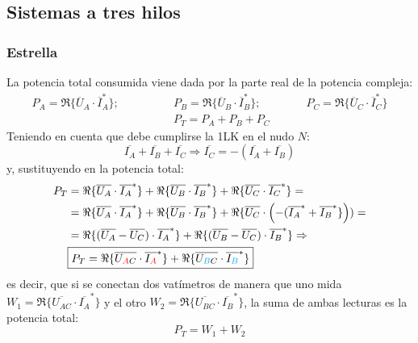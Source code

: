 	\subsection{Sistemas a tres hilos}\label{sec:potencia_3H}
	
	\subsubsection{Estrella}
	
	La potencia total consumida viene dada por la parte real de la potencia compleja: 
	\begin{align*}
	    P_A=\Re\{\overline{U}_A \cdot \overline{I}_A^*\};\qquad \qquad
	    &P_B=\Re\{\overline{U}_B \cdot \overline{I}_B^*\};\qquad \qquad
	    P_C=\Re\{\overline{U}_C \cdot \overline{I}_C^*\}\\
	    &P_T=P_A+P_B+P_C
	\end{align*}
	Teniendo en cuenta que debe cumplirse la 1LK en el nudo $N$:
	\begin{equation*}
	    \overline{I_A}+\overline{I_B}+\overline{I_C}\Rightarrow \overline{I_C}=-(\overline{I_A}+\overline{I_B})
	\end{equation*}
	y, sustituyendo en la potencia total: 
	\begin{align}
          P_T &= \Re\{\overline{U_{A}} \cdot \overline{I_A}^*\} + \Re\{\overline{U_{B}} \cdot  \overline{I_B}^*\} + \Re\{\overline{U_{C}} \cdot \overline{I_C}^*\} = \nonumber\\
          &= \Re\{\overline{U_{A}} \cdot  \overline{I_A}^*\} + \Re\{\overline{U_{B}} \cdot  \overline{I_B}^*\} + \Re\{\overline{U_{C}} \cdot \left(-(\overline{I_A}^*+\overline{I_B}^*\}\right))=\nonumber \\
	    & =\Re\{(\overline{U_A}-\overline{U_C}) \cdot  \overline{I_A}^*\} + \Re\{(\overline{U_B}-\overline{U_C}) \cdot  \overline{I_B}^*\} \Rightarrow \nonumber\\  &\boxed{P_T = \Re\{\overline{U_{\textcolor{red}{A}C}} \cdot \overline{I_{\textcolor{red}{A}}}^*\} + \Re\{\overline{U_{\textcolor{cyan}{B}C}} \cdot \overline{I_{\textcolor{cyan}{B}}}^*\}}
	\end{align}
	es decir, que si se conectan dos vatímetros de manera que uno mida $W_1=\Re\{\overline{U_{AC}} \cdot \overline{I_A}^*\}$ y el otro $W_2=\Re\{\overline{U_{BC}} \cdot \overline{I_B}^*\}$, la suma de ambas lecturas es la potencia total: 
	\begin{equation*}
	    P_T=W_1+W_2
	\end{equation*}
